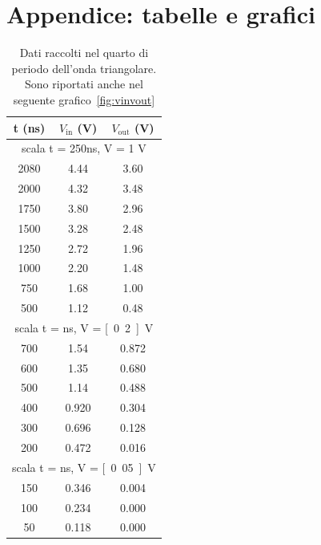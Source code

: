\documentclass[italian,a4paper]{article}
\begin{document}
\section{Appendice: tabelle e grafici}
\begin{table}[h]\caption{Dati raccolti nel quarto di periodo dell'onda
    triangolare. Sono riportati anche nel seguente
    grafico~\ref{fig:vinvout}}\label{tab:vinvout}
    \centering
    \begin{tabular}{*3c}
t (ns) &   $V_{\text{in}}$ (V) &  $V_{\text{out}}$ (V)\\\hline
\multicolumn{3}{c}{scala t = 250ns, V = 1 V}\\
2080&   4.44&   3.60\\
2000&   4.32&   3.48\\
1750&   3.80&   2.96\\
1500&   3.28&   2.48\\
1250&   2.72&   1.96\\
1000&   2.20&   1.48\\
750&    1.68&   1.00\\
500&    1.12&   0.48\\\hline 
\multicolumn{3}{c}{scala t = \unit[100]{ns}, V = \unit[0.2]{V}}\\
700&    1.54&   0.872\\
600&    1.35&   0.680\\
500&    1.14&   0.488\\
400&    0.920&  0.304\\
300&    0.696&  0.128\\
200&    0.472&  0.016\\\hline  
\multicolumn{3}{c}{scala t = \unit[50]{ns}, V = \unit[0.05]{V}}\\
150&    0.346&  0.004\\
100&    0.234&  0.000\\
50&0.118&  0.000
\end{tabular}
\end{table}
\end{document}
